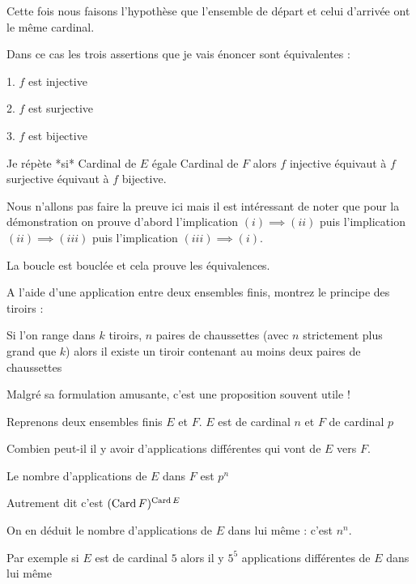 Cette fois nous faisons l'hypothèse 
que l'ensemble de départ et celui d'arrivée ont le même cardinal.

Dans ce cas les trois assertions que je vais énoncer sont équivalentes :

\change

1. $f$ est injective

2. $f$ est surjective

3. $f$ est bijective


Je répète *si* Cardinal de $E$ égale Cardinal de $F$ alors 
$f$ injective équivaut à $f$ surjective équivaut à $f$ bijective.

\change

Nous n'allons pas faire la preuve ici mais il est intéressant de noter que pour la démonstration
on prouve d'abord l'implication $ (i) \implies (ii)$
puis l'implication $(ii)  \implies (iii)$ puis l'implication $(iii) \implies (i) $.

La boucle est bouclée et cela prouve les équivalences.

\change

A l'aide d'une application entre deux ensembles finis, montrez le principe des tiroirs :

Si l'on range dans $k$ tiroirs, $n$ paires de chaussettes (avec $n$ strictement plus grand que $k$)
alors il existe un tiroir contenant au moins deux paires
de chaussettes


Malgré sa formulation amusante, c'est une proposition souvent utile !

\diapo

Reprenons deux ensembles finis $E$ et $F$.
$E$ est de cardinal $n$ et $F$ de cardinal $p$


Combien peut-il il y avoir d'applications différentes qui vont de $E$ vers $F$.

\change

Le nombre d'applications de $E$ dans $F$ est $p^n$


\change

Autrement dit c'est $(\mathop{\text{Card}}\nolimits F)^{\mathop{\text{Card}}\nolimits E}$


\change

On en déduit le nombre d'applications de $E$ dans lui même : c'est $n^n$.

\change

Par exemple si $E$ est de cardinal $5$ alors il y $5^5$ applications
différentes de $E$ dans lui même





